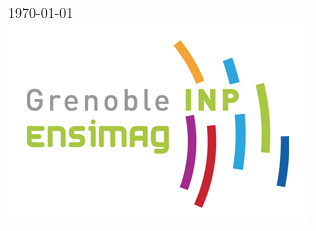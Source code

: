 \begin{center}

{\large \today}\\[2cm] %


\includegraphics[scale=0.5]{pics/ensimag.jpg}\\[1cm] %


\vfill %
\newpage
\end{center}
